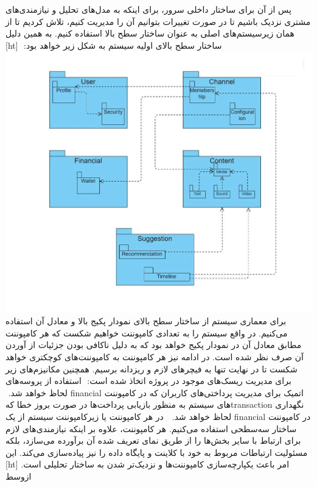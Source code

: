 ‫
‫پس از آن برای ساختار داخلی سرور، برای اینکه به مدل‌های تحلیل و نیازمندی‌های مشتری نزدیک باشیم تا در صورت تغییرات بتوانیم آن را مدیریت کنیم، تلاش کردیم تا از همان زیرسیستم‌های اصلی به عنوان ساختار سطح بالا استفاده کنیم. به همین دلیل ساختار سطح بالای اولیه سیستم به شکل زیر خواهد بود:
‫
‫[ht]
\includegraphics[scale=0.4]{figs/subsystem.jpg}
‫
‫
‫
‫
‫برای معماری سیستم از ساختار سطح بالای نمودار پکیج بالا و معادل آن استفاده می‌کنیم. در واقع سیستم را به تعدادی کامپوننت خواهیم شکست که هر کامپوننت مطابق معادل آن در نمودار پکیج خواهد بود که به دلیل ناکافی بودن جزئیات از آوردن آن صرف نظر شده است. در ادامه نیز هر کامپوننت به کامپوننت‌های کوچکتری خواهد شکست تا در نهایت تنها به فیچرهای‌ لازم و ریزدانه برسیم. همچنین مکانیزم‌های زیر برای مدیریت ریسک‌های موجود در پروژه اتخاذ شده است:
‫
‫ استفاده از پروسه‌های اتمیک برای مدیریت پرداختی‌های کاربران که در کامپوننت financial لحاظ خواهد شد.
‫
‫نگهداری transactionهای سیستم به منظور بازیابی پرداخت‌ها در صورت بروز خطا که در کامپوننت financial لحاظ خواهد شد.
‫
‫
‫در هر کامپوننت یا زیرکامپوننت سیستم از یک ساختار سه‌سطحی استفاده می‌کنیم. هر کامپوننت، علاوه بر اینکه نیازمندی‌های لازم برای ارتباط با سایر بخش‌ها را از طریق نمای تعریف شده آن برآورده می‌سازد، بلکه مسئولیت ارتباطات مربوط به خود با کلاینت و پایگاه داده را نیز پیاده‌سازی می‌کند. این امر باعث یکپارچه‌سازی کامپوننت‌ها و نزدیک‌تر شدن به ساختار تحلیلی است.
‫[ht]
‫‌ازوسط
